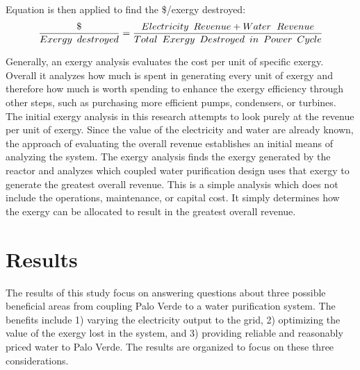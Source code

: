 Equation \cite{revenueX} is then applied to find the \$/exergy destroyed:
\begin{equation}
\frac{\$}{Exergy\hspace{.175cm}destroyed}=\frac{Electricity \hspace{.175cm} Revenue+ Water \hspace{.2cm} Revenue} {Total\hspace{.175cm}Exergy\hspace{.175cm}Destroyed\hspace{.175cm}in\hspace{.175cm}Power\hspace{.175cm}Cycle}
\label{revenueX}
\end{equation}

Generally, an exergy analysis evaluates the cost per unit of specific exergy.  Overall it analyzes how much is spent in generating every unit of exergy and therefore how much is worth spending to enhance the exergy efficiency through other steps, such as purchasing more efficient pumps, condensers, or turbines.  The initial exergy analysis in this research attempts to look purely at the revenue per unit of exergy.  Since the value of the electricity and water are already known, the approach of evaluating the overall revenue establishes an initial means of analyzing the system. The exergy analysis finds the exergy generated by the reactor and analyzes which coupled water purification design uses that exergy to generate the greatest overall revenue.  This is a simple analysis which does not include the operations, maintenance, or capital cost.  It simply determines how the exergy can be allocated to result in the greatest overall revenue.


\section{Results}

The results of this study focus on answering questions about three possible beneficial areas from coupling Palo Verde to a water purification system. The benefits include 1) varying the electricity output to the grid, 2) optimizing the value of the exergy lost in the system, and 3) providing reliable and reasonably priced water to Palo Verde.  The results are organized to focus on these three considerations.


